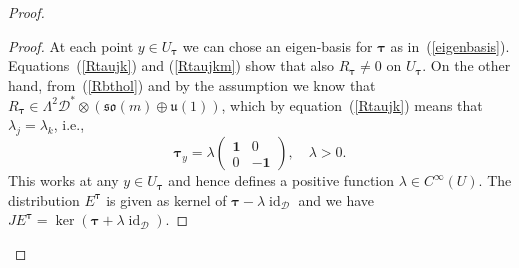 \documentclass{amsart}
\theoremstyle{plain}
\newtheorem{lem}[theorem]{Lemma}
\theoremstyle{definition}
\newcommand{\id}{\operatorname{id}}
\def\so{\mathfrak{so}}
\def\u{\mathfrak{u}}
\newcommand{\bt}{{\boldsymbol{\tau}}}
\newcommand{\Real}{\mathbb{R}}
\newcommand{\1}{\mathbf{1}}
\newcommand{\D}{{\mathcal D}}
\newcommand{\E}{{E}}
\newcommand{\+}{\oplus}
\begin{document}
\begin{proof}
\begin{proof} 
At each point $y\in U_\bt$ we can chose an eigen-basis for $\bt$ as in~(\ref{eigenbasis}). 
Equations~(\ref{Rtaujk}) and (\ref{Rtaujkm}) show that also $R_\bt\not=0$ on $U_\bt$. On the other hand,   from~(\ref{Rbthol}) and by the assumption we know that $R_\bt\in \Lambda^2\D^* \otimes (\so(m)\+\u(1))$, which  by equation~(\ref{Rtaujk}) means that  $\lambda_j=\lambda_k$, i.e., 
	$$\bt_y=\lambda\left( \begin{matrix} \1& 0\\0&-\1\end{matrix}\right),\quad\lambda > 0.$$
This works at any $y\in U_\bt$ and hence defines a positive function $\lambda\in C^\infty(U)$. The distribution $\E^\bt$ is given as kernel of $\bt-\lambda \id_\D$ and we have $J\E^\bt=\ker(\bt+\lambda\id_\D)$.
 \end{proof}
%
%
%
%
%
%
%
%
%
%


\end{proof}
\end{document}
